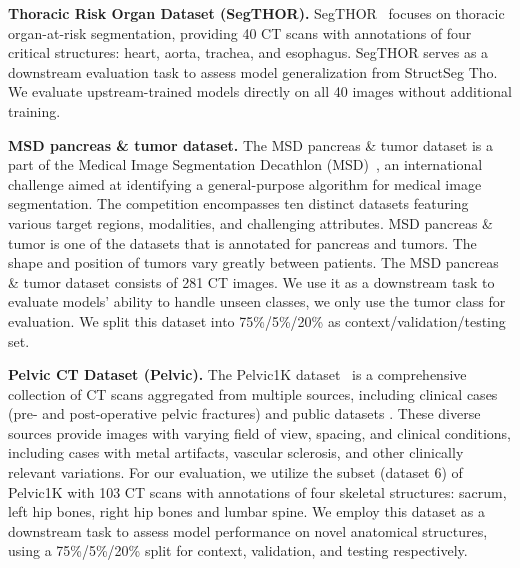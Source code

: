 \noindent\textbf{Thoracic Risk Organ Dataset (SegTHOR).} SegTHOR~\cite{lambert2020segthor} focuses on thoracic organ-at-risk segmentation, providing 40 CT scans with annotations of four critical structures: heart, aorta, trachea, and esophagus. SegTHOR serves as a downstream evaluation task to assess model generalization from StructSeg Tho. We evaluate upstream-trained models directly on all 40 images without additional training.

\noindent\textbf{MSD pancreas \& tumor dataset.}
The MSD pancreas \& tumor dataset is a part of the Medical Image Segmentation Decathlon (MSD)~\cite{antonelli2022medical}, an international challenge aimed at identifying a general-purpose algorithm for medical image segmentation. The competition encompasses ten distinct datasets featuring various target regions, modalities, and challenging attributes. MSD pancreas \& tumor is one of the datasets that is annotated for pancreas and tumors. The shape and position of tumors vary greatly between patients. The MSD pancreas \& tumor dataset consists of 281 CT images. We use it as a downstream task to evaluate models' ability to handle unseen classes, we only use the tumor class for evaluation. We split this dataset into 75\%/5\%/20\% as context/validation/testing set.


\noindent\textbf{Pelvic CT Dataset (Pelvic).} The Pelvic1K dataset~\cite{liu2021deep} is a comprehensive collection of CT scans aggregated from multiple sources, including clinical cases (pre- and post-operative pelvic fractures) and public datasets . These diverse sources provide images with varying field of view, spacing, and clinical conditions, including cases with metal artifacts, vascular sclerosis, and other clinically relevant variations. For our evaluation, we utilize the subset (dataset 6) of Pelvic1K with 103 CT scans with annotations of four skeletal structures: sacrum, left hip bones, right hip bones and lumbar spine. We employ this dataset as a downstream task to assess model performance on novel anatomical structures, using a 75\%/5\%/20\% split for context, validation, and testing respectively.

